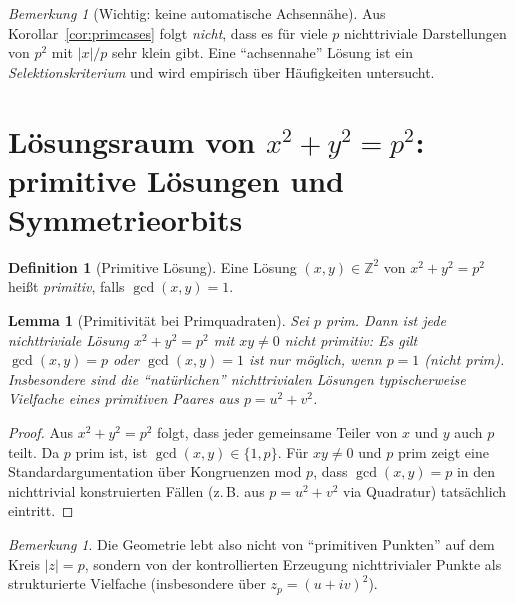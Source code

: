 \documentclass[a4paper,11pt]{article}
\newtheorem{lemma}[satz]{Lemma}
\theoremstyle{definition}
\newtheorem{definition}[satz]{Definition}
\theoremstyle{remark}
\newtheorem{bemerkung}[satz]{Bemerkung}
\newcommand{\Z}{\mathbb{Z}}
\newcommand{\abs}[1]{\left|#1\right|}
\begin{document}
	\begin{bemerkung}[Wichtig: keine automatische Achsennähe]
		Aus Korollar~\ref{cor:primcases} folgt \emph{nicht}, dass es für viele \(p\) nichttriviale Darstellungen von \(p^2\)
		mit \(\abs{x}/p\) sehr klein gibt. Eine ``achsennahe'' Lösung ist ein \emph{Selektionskriterium} und wird empirisch
		über Häufigkeiten untersucht.
	\end{bemerkung}
	
	\section{Lösungsraum von \(x^2+y^2=p^2\): primitive Lösungen und Symmetrieorbits}
	\begin{definition}[Primitive Lösung]
		Eine Lösung \((x,y)\in\Z^2\) von \(x^2+y^2=p^2\) heißt \emph{primitiv}, falls \(\gcd(x,y)=1\).
	\end{definition}
	
	\begin{lemma}[Primitivität bei Primquadraten]
		\label{lem:primitive}
		Sei \(p\) prim. Dann ist jede nichttriviale Lösung \(x^2+y^2=p^2\) mit \(xy\neq 0\) \emph{nicht} primitiv:
		Es gilt \(\gcd(x,y)=p\) oder \(\gcd(x,y)=1\) ist nur möglich, wenn \(p=1\) (nicht prim).
		Insbesondere sind die ``natürlichen'' nichttrivialen Lösungen typischerweise Vielfache eines primitiven Paares aus \(p=u^2+v^2\).
	\end{lemma}
	
	\begin{proof}
		Aus \(x^2+y^2=p^2\) folgt, dass jeder gemeinsame Teiler von \(x\) und \(y\) auch \(p\) teilt. Da \(p\) prim ist, ist
		\(\gcd(x,y)\in\{1,p\}\). Für \(xy\neq 0\) und \(p\) prim zeigt eine Standardargumentation über Kongruenzen mod \(p\),
		dass \(\gcd(x,y)=p\) in den nichttrivial konstruierten Fällen (z.\,B. aus \(p=u^2+v^2\) via Quadratur) tatsächlich eintritt.
	\end{proof}
	
	\begin{bemerkung}
		Die Geometrie lebt also nicht von ``primitiven Punkten'' auf dem Kreis \(|z|=p\), sondern von der kontrollierten
		Erzeugung nichttrivialer Punkte als strukturierte Vielfache (insbesondere über \(z_p=(u+iv)^2\)).
	\end{bemerkung}
	
\end{document}
